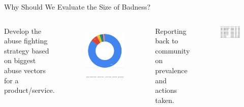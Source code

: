 \documentclass[nobackground,dvipsnames,table]{beamer}
\begin{document}
\begin{frame}{Why Should We Evaluate the Size of Badness?}
    \begin{columns}[T]
            \centering
            \small{Develop the abuse fighting strategy based on biggest abuse vectors for a product/service.}
            \begin{figure}
                \includegraphics[width=\textwidth]{abuse-vectors}
                \includegraphics[width=1.25\textwidth]{abuse-vectors-key}
            \end{figure}
            \centering
            \small{Reporting back to community on prevalence and actions taken.}
            \begin{figure}
                \includegraphics[width=\textwidth]{facebook-community-reports}
            \end{figure}
    \end{columns}
\end{frame}
\end{document}
